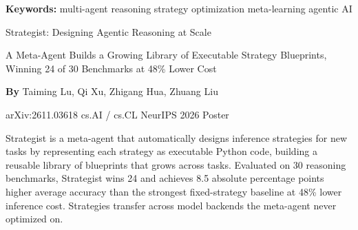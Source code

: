 \documentclass[10pt,twocolumn]{article}
\begin{document}
\setlength{\parindent}{0pt}
\setlength{\parskip}{4pt}

{\small\color{keywordgray}\textbf{Keywords:}
  multi-agent reasoning \textbullet{}
  strategy optimization \textbullet{}
  meta-learning \textbullet{}
  agentic AI}\par\vspace{4pt}

{\LARGE\bfseries\raggedright
  Strategist: Designing Agentic Reasoning at Scale}\par\vspace{4pt}

{\large\itshape\raggedright
  A Meta-Agent Builds a Growing Library of Executable Strategy
  Blueprints, Winning 24 of 30 Benchmarks at 48\% Lower Cost}\par\vspace{6pt}

{\small\textbf{By} Taiming Lu, Qi Xu, Zhigang Hua, Zhuang Liu}\par\vspace{2pt}

{\small\color{keywordgray}arXiv:2611.03618 \textbullet{}
  cs.AI / cs.CL \textbullet{} NeurIPS 2026 Poster}
\par\vspace{2pt}\noindent{\color{rulered}\rule{\columnwidth}{0.6pt}}\vspace{6pt}

Strategist is a meta-agent that automatically designs inference strategies
for new tasks by representing each strategy as executable Python code,
building a reusable library of blueprints that grows across tasks.
Evaluated on 30 reasoning benchmarks, Strategist wins 24 and achieves
8.5 absolute percentage points higher average accuracy than the strongest
fixed-strategy baseline at 48\% lower inference cost. Strategies transfer
across model backends the meta-agent never optimized on.
\end{document}
